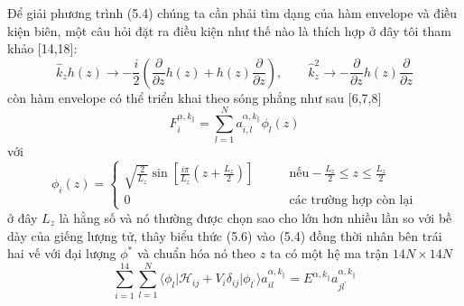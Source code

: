 Để giải phương trình (5.4) chúng ta cần phải tìm dạng của hàm envelope và điều kiện biên, một câu hỏi đặt ra điều kiện như thế nào là thích hợp ở đây tôi tham khảo [14,18]:
\begin{equation}
\hat{k}_zh(z)\longrightarrow -\frac{i}{2}\left(\frac{\partial}{\partial z}h(z) + h(z)\frac{\partial}{\partial z}\right), \qquad \hat{k}_z^2 \longrightarrow -\frac{\partial}{\partial z}h(z)\frac{\partial}{\partial z}
\end{equation}	  
còn hàm envelope có thể triển khai theo sóng phẳng như sau [6,7,8]
\begin{equation}
F_i^{\alpha,k_{\parallel}} = \sum_{l=1}^N a_{i,l}^{{\alpha},k_{\parallel}}\phi_l(z)
\end{equation}
với 
\begin{equation}
\phi_i\left(z\right) =  \begin{cases}
\sqrt{\frac{2}{L_z}}\sin\left[\frac{i\pi}{L_z}\left(z +\frac{L_z}{2}\right)\right] &\qquad\text{nếu} -\frac{L_z}{2}\le z\le \frac{L_z}{2}\\
0 &\qquad\text{các trường hợp còn lại}
\end{cases}
\end{equation}
ở đây $L_z$ là hằng số và nó thường được chọn sao cho lớn hơn nhiều lần so với bề dày của giếng lượng tử, thây biểu thức (5.6) vào (5.4) đồng thời nhân bên trái hai vế với đại lượng $\phi^{*}$ và chuẩn hóa nó theo $z$ ta có một hệ ma trận $14N\times 14N$
\begin{equation}
\sum_{i=1}^{14}\sum_{l=1}^{N}\langle \phi_{l} \vert \mathcal{H}_{ij} +V_i\delta_{ij}\vert \phi_{l^{'}} \rangle a_{il}^{\alpha,k_{\parallel}} = E^{\alpha,k_{\parallel}} a_{j
l^{'}}^{\alpha,k_{\parallel}}
\end{equation}
